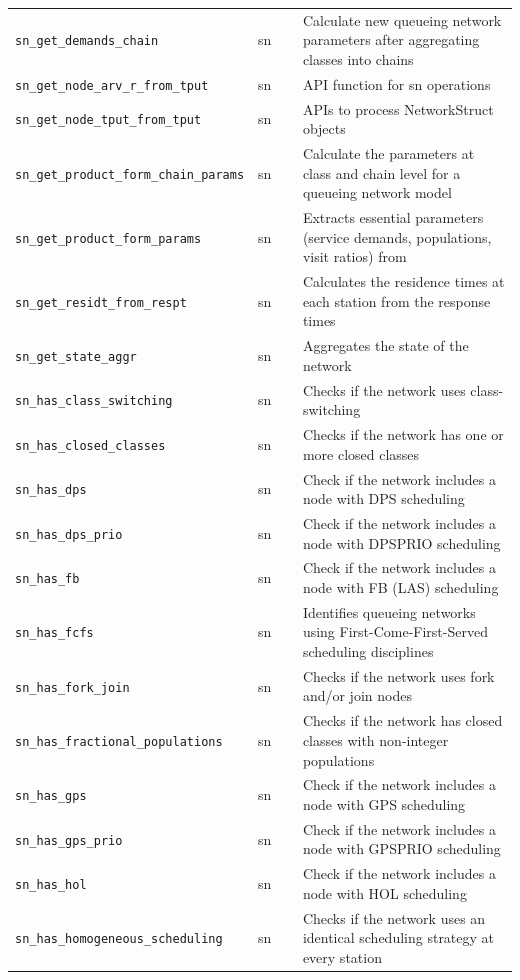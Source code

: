 \begin{footnotesize}
\begin{longtable}{|p{0.4\linewidth}|p{0.1\linewidth}|p{0.5\linewidth}|}
\texttt{sn\_get\_demands\_chain} & sn & Calculate new queueing network parameters after aggregating classes into chains\\
\texttt{sn\_get\_node\_arv\_r\_from\_tput} & sn & API function for sn operations\\
\texttt{sn\_get\_node\_tput\_from\_tput} & sn & APIs to process NetworkStruct objects\\
\texttt{sn\_get\_product\_form\_chain\_params} & sn & Calculate the parameters at class and chain level for a queueing network model\\
\texttt{sn\_get\_product\_form\_params} & sn & Extracts essential parameters (service demands, populations, visit ratios) from\\
\texttt{sn\_get\_residt\_from\_respt} & sn & Calculates the residence times at each station from the response times\\
\texttt{sn\_get\_state\_aggr} & sn & Aggregates the state of the network\\
\texttt{sn\_has\_class\_switching} & sn & Checks if the network uses class-switching\\
\texttt{sn\_has\_closed\_classes} & sn & Checks if the network has one or more closed classes\\
\texttt{sn\_has\_dps} & sn & Check if the network includes a node with DPS scheduling\\
\texttt{sn\_has\_dps\_prio} & sn & Check if the network includes a node with DPSPRIO scheduling\\
\texttt{sn\_has\_fb} & sn & Check if the network includes a node with FB (LAS) scheduling\\
\texttt{sn\_has\_fcfs} & sn & Identifies queueing networks using First-Come-First-Served scheduling disciplines\\
\texttt{sn\_has\_fork\_join} & sn & Checks if the network uses fork and/or join nodes\\
\texttt{sn\_has\_fractional\_populations} & sn & Checks if the network has closed classes with non-integer populations\\
\texttt{sn\_has\_gps} & sn & Check if the network includes a node with GPS scheduling\\
\texttt{sn\_has\_gps\_prio} & sn & Check if the network includes a node with GPSPRIO scheduling\\
\texttt{sn\_has\_hol} & sn & Check if the network includes a node with HOL scheduling\\
\texttt{sn\_has\_homogeneous\_scheduling} & sn & Checks if the network uses an identical scheduling strategy at every station\\

\end{longtable}
\end{footnotesize}
